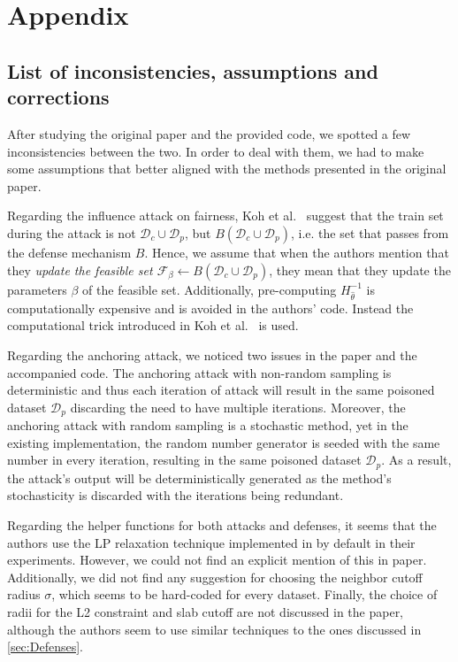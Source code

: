 \newpage
\section*{Appendix}
\subsection{List of inconsistencies, assumptions and corrections}
\label{app:inconsistencies}
After studying the original paper and the provided code, we spotted a few inconsistencies between the two. In order to deal with them, we had to make some assumptions that better aligned with the methods presented in the original paper.

Regarding the influence attack on fairness, Koh et al.~\cite{koh2018} suggest that the train set during the attack is not $\mathcal{D}_c \cup \mathcal{D}_p$, but $B(\mathcal{D}_c \cup \mathcal{D}_p)$, i.e. the set that passes from the defense mechanism $B$. Hence, we assume that when the authors mention that they \textit{update the feasible set $\mathcal{F}_{\beta} \leftarrow B(\mathcal{D}_c \cup \mathcal{D}_p)$}, they mean that they update the parameters $\beta$ of the feasible set. Additionally, pre-computing $H^{-1}_{\hat{\theta}}$ is computationally expensive and is avoided in the authors' code. Instead the computational trick introduced in Koh et al.~\cite{koh2017} is used.

Regarding the anchoring attack, we noticed two issues in the paper and the accompanied code. The anchoring attack with non-random sampling is deterministic and thus each iteration of attack will result in the same poisoned dataset $\mathcal{D}_p$ discarding the need to have multiple iterations. Moreover, the anchoring attack with random sampling is a stochastic method, yet in the existing implementation, the random number generator is seeded with the same number in every iteration, resulting in the same poisoned dataset $\mathcal{D}_p$. As a result, the attack's output will be deterministically generated as the method's stochasticity is discarded with the iterations being redundant.

Regarding the helper functions for both attacks and defenses, it seems that the authors use the LP relaxation technique implemented in \cite{koh2018} by default in their experiments. However, we could not find an explicit mention of this in paper. Additionally, we did not find any suggestion for choosing the neighbor cutoff radius $\sigma$, which seems to be hard-coded for every dataset. Finally, the choice of radii for the L2 constraint and slab cutoff are not discussed in the paper, although the authors seem to use similar techniques to the ones discussed in \ref{sec:Defenses}.

